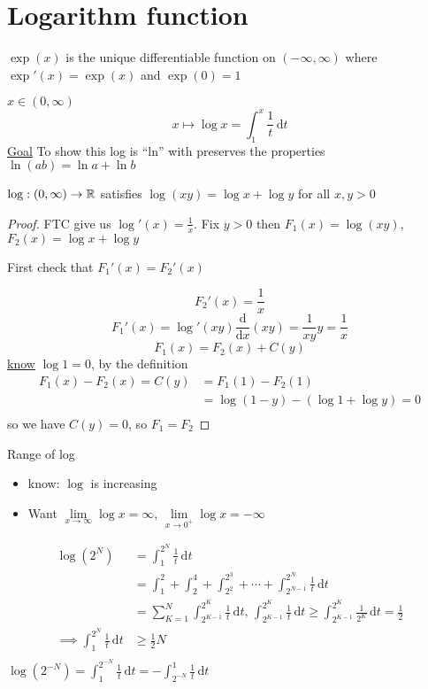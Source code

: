 \section{Logarithm function}

\begin{definition*}
  $\exp(x)$ is the unique differentiable function on $(-\infty, \infty)$  
  where $\exp'(x) = \exp(x)$ and $\exp(0) = 1$
\end{definition*}

\begin{example*}
  $x \in (0, \infty)$
  \[x \mapsto \log x = \int_1^x \frac{1}{t}\,\mathrm{d}t\]
  \underline{Goal} To show this log is ``ln'' with preserves the properties $\ln(ab) = \ln a + \ln b$
\end{example*}

\begin{theorem*}
  $\log : (0, \infty) \to \mathbb R$ satisfies $\log(xy) = \log x + \log y$ for all $x, y > 0$
\end{theorem*}

\begin{proof}
  FTC give us $\log'(x) = \frac{1}{x}$.
  Fix $y > 0$ then $F_1(x) = \log(xy)$, $F_2(x) = \log x + \log y$

  First check that $F_1'(x) = F_2'(x)$

  \[F_2'(x) = \frac{1}{x}\]
  \[F_1'(x) = \log'(xy) \frac{\mathrm{d}}{\mathrm{d}x}(xy) = \frac{1}{xy}y=\frac{1}{x}\]
  \[F_1(x) = F_2(x) + C(y)\]
  \underline{know} $\log 1 = 0$, by the definition
  \begin{align*}
    F_1(x) - F_2(x) = C(y) &= F_1(1) - F_2(1) \\
    &= \log(1-y) - (\log 1 + \log y)  = 0\\
  \end{align*}
  so we have $C(y) = 0$, so $F_1 = F_2$
\end{proof}

Range of log
\begin{itemize}
  \item know: $\log$ is increasing
  \item Want $\lim\limits_{x\to \infty} \log x = \infty$, $\lim\limits_{x\to 0^+} \log x = -\infty$
\end{itemize}
\begin{align*}
  \log(2^N) &= \int_1^{2^N} \frac{1}{t}\,\mathrm{d}t \\
  &= \int_1^2 + \int_2^4 + \int_{2^2}^{2^3} + \cdots + \int_{2^{N-1}}^{2^N} \frac{1}{t}\,\mathrm{d}t\\
  &= \sum_{K=1}^N \int_{2^{K-1}}^{2^K} \frac{1}{t}\,\mathrm{d}t,\, \int_{2^{K-1}}^{2^K} \frac{1}{t}\,\mathrm{d}t \ge \int_{2^{K-1}}^{2^K} \frac{1}{2^K}\,\mathrm{d}t =\frac{1}{2}\\
  \implies \int_1^{2^N} \frac{1}{t}\,\mathrm{d}t &\ge \frac{1}{2}N\\
\end{align*}
$\displaystyle\log(2^{-N}) = \int_1^{2^{-N}} \frac{1}{t}\,\mathrm{d}t =-\int_{2^{-N}}^1 \frac{1}{t}\,\mathrm{d}t$


